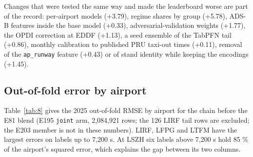 \documentclass[
  manuscript=article,  %
  layout=preprint,     %
  year=2026,
  volume=4,
]{extra/joas}
\begin{document}
Changes that were tested the same way and made the leaderboard worse are part of the record: per-airport models (+3.79), regime shares by group (+5.78), ADS-B features inside the base model (+0.33), adversarial-validation weights (+1.77), the OPDI correction at EDDF (+1.13), a seed ensemble of the TabPFN tail (+0.86), monthly calibration to published PRU taxi-out times (+0.11), removal of the \texttt{ap\_\allowbreak{}runway} feature (+0.43) or of stand identity while keeping the encodings (+1.45).

\subsection{Out-of-fold error by airport}\label{out-of-fold-error-by-airport}

Table~\ref{tab:8} gives the 2025 out-of-fold RMSE by airport for the chain before the E81 blend (E195 \texttt{joint} arm, 2,084,921 rows; the 126 LIRF tail rows are excluded; the E203 member is not in these numbers). LIRF, LFPG and LTFM have the largest errors on labels up to 7,200 s. At LSZH six labels above 7,200 s hold 85 \% of the airport's squared error, which explains the gap between its two columns.
\end{document}
